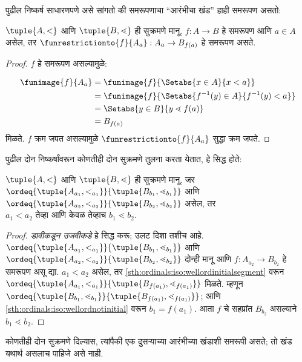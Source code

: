 पुढील निष्कर्ष साधारणपणे असे सांगतो की समरूपणाचा ``आरंभीचा खंड'' हाही समरूपण असतो:

\begin{lem}\label{sth:ordinals:iso:wellordinitialsegment}
$\tuple{A, <}$ आणि $\tuple{B, \lessdot}$ ही सुक्रमणे मानू. $f
\colon A \to B$ हे समरूपण आणि $a \in A$ असेल, तर
$\funrestrictionto{f}{A_{a}} : A_a \to B_{f(a)}$ हे समरूपण असते.
\end{lem}

\begin{proof}
$f$ हे समरूपण असल्यामुळे:

\begin{align*}
	\funimage{f}{A_a} &= \funimage{f}{\Setabs{x \in A}{x < a}}\\
	&= \funimage{f}{\Setabs{f^{-1}(y) \in A}{f^{-1}(y) < a}} \\
	&= \Setabs{y \in B}{y \lessdot f(a)} \\
	&=B_{f(a)}
\end{align*}
मिळते. $f$ क्रम जपत असल्यामुळे $\funrestrictionto{f}{A_a}$ सुद्धा क्रम जपते.
\end{proof}

पुढील दोन निष्कर्षांवरून कोणतीही दोन सुक्रमणे तुलना करता येतात, हे सिद्ध होते:

\begin{lem}\label{sth:ordinals:iso:lemordsegments}
$\tuple{A, <}$ आणि $\tuple{B, \lessdot}$ ही सुक्रमणे मानू. जर
$\ordeq{\tuple{A_{a_1}, <_{a_1}}}{\tuple{B_{b_1}, \lessdot_{b_1}}}$
आणि $\ordeq{\tuple{A_{{a_2}}, <_{a_2}}}{\tuple{B_{{b_2}},
\lessdot_{b_2}}}$ असेल, तर ${a_1}  < {a_2} \text{ तेव्हा आणि केवळ तेव्हाच }{b_1} \lessdot
{b_2}$.
\end{lem}

\begin{proof}
\emph{डावीकडून उजवीकडे} हे सिद्ध करू; उलट दिशा तशीच आहे.
$\ordeq{\tuple{A_{a_1}, <_{a_1}}}{\tuple{B_{b_1},
\lessdot_{b_1}}}$ आणि $\ordeq{\tuple{A_{{a_2}},
<_{a_2}}}{\tuple{B_{{b_2}}, \lessdot_{b_2}}}$ दोन्ही मानू आणि $f \colon
A_{{a_2}} \to B_{{b_2}}$ हे समरूपण असू द्या. ${a_1} < {a_2}$ असेल, तर
\ref{sth:ordinals:iso:wellordinitialsegment} वरून
$\ordeq{\tuple{A_{a_1}, <_{a_1}}}{\tuple{B_{f({a_1})},
\lessdot_{f({a_1})}}}$ मिळते. म्हणून
$\ordeq{\tuple{B_{b_1}, \lessdot_{b_1}}}{\tuple{B_{f({a_1})},
\lessdot_{f({a_1})}}}$; आणि \ref{sth:ordinals:iso:wellordnotinitial} वरून ${b_1} = f({a_1})$. आता $f$ चे सहप्रांत $B_{{b_2}}$ असल्याने ${b_1} \lessdot {b_2}$.
\end{proof}

\begin{thm}\label{sth:ordinals:iso:thm:woalwayscomparable}
कोणतीही दोन सुक्रमणे दिल्यास, त्यांपैकी एक दुसऱ्याच्या आरंभीच्या खंडाशी समरूपी असते; तो खंड यथार्थ असलाच पाहिजे असे नाही.
\end{thm}

